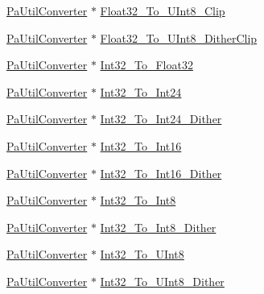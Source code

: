 \begin{DoxyCompactItemize}
\item 
\hyperlink{pa__converters_8h_a4f65f7c2e9e185e7f8caebe85ae9575c}{Pa\+Util\+Converter} $\ast$ \hyperlink{struct_pa_util_converter_table_a5275ac0893adb09ca0873c61c937309d}{Float32\+\_\+\+To\+\_\+\+U\+Int8\+\_\+\+Clip}
\item 
\hyperlink{pa__converters_8h_a4f65f7c2e9e185e7f8caebe85ae9575c}{Pa\+Util\+Converter} $\ast$ \hyperlink{struct_pa_util_converter_table_a9d89e0192b8162e50edb545e95d875c0}{Float32\+\_\+\+To\+\_\+\+U\+Int8\+\_\+\+Dither\+Clip}
\item 
\hyperlink{pa__converters_8h_a4f65f7c2e9e185e7f8caebe85ae9575c}{Pa\+Util\+Converter} $\ast$ \hyperlink{struct_pa_util_converter_table_a8972c97142ce75cf251a9e76e687e312}{Int32\+\_\+\+To\+\_\+\+Float32}
\item 
\hyperlink{pa__converters_8h_a4f65f7c2e9e185e7f8caebe85ae9575c}{Pa\+Util\+Converter} $\ast$ \hyperlink{struct_pa_util_converter_table_a374be7d29ed710b488d0980e540a3823}{Int32\+\_\+\+To\+\_\+\+Int24}
\item 
\hyperlink{pa__converters_8h_a4f65f7c2e9e185e7f8caebe85ae9575c}{Pa\+Util\+Converter} $\ast$ \hyperlink{struct_pa_util_converter_table_a2e120380bc1f476c88805f4425eda05c}{Int32\+\_\+\+To\+\_\+\+Int24\+\_\+\+Dither}
\item 
\hyperlink{pa__converters_8h_a4f65f7c2e9e185e7f8caebe85ae9575c}{Pa\+Util\+Converter} $\ast$ \hyperlink{struct_pa_util_converter_table_ab3d7c1e04c7bc6d750b0ade5c60635ce}{Int32\+\_\+\+To\+\_\+\+Int16}
\item 
\hyperlink{pa__converters_8h_a4f65f7c2e9e185e7f8caebe85ae9575c}{Pa\+Util\+Converter} $\ast$ \hyperlink{struct_pa_util_converter_table_a2d7fd46de928fa784d3b74b718c265a8}{Int32\+\_\+\+To\+\_\+\+Int16\+\_\+\+Dither}
\item 
\hyperlink{pa__converters_8h_a4f65f7c2e9e185e7f8caebe85ae9575c}{Pa\+Util\+Converter} $\ast$ \hyperlink{struct_pa_util_converter_table_a7201612642789047cea27f922324c508}{Int32\+\_\+\+To\+\_\+\+Int8}
\item 
\hyperlink{pa__converters_8h_a4f65f7c2e9e185e7f8caebe85ae9575c}{Pa\+Util\+Converter} $\ast$ \hyperlink{struct_pa_util_converter_table_a7b5fec6aef6cf4ad6d70301083f5107e}{Int32\+\_\+\+To\+\_\+\+Int8\+\_\+\+Dither}
\item 
\hyperlink{pa__converters_8h_a4f65f7c2e9e185e7f8caebe85ae9575c}{Pa\+Util\+Converter} $\ast$ \hyperlink{struct_pa_util_converter_table_afd0348c310748ad681344e775e4a6c80}{Int32\+\_\+\+To\+\_\+\+U\+Int8}
\item 
\hyperlink{pa__converters_8h_a4f65f7c2e9e185e7f8caebe85ae9575c}{Pa\+Util\+Converter} $\ast$ \hyperlink{struct_pa_util_converter_table_a9660a8833606cd1f70796b11cced9496}{Int32\+\_\+\+To\+\_\+\+U\+Int8\+\_\+\+Dither}

\end{DoxyCompactItemize}

